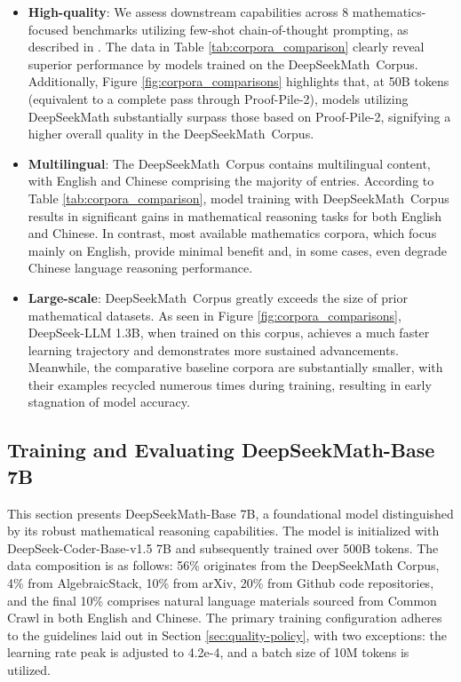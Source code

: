 \begin{itemize}[topsep=0pt]
\begin{itemize}[topsep=0pt]
    \item \textbf{High-quality}: 
    We assess downstream capabilities across 8 mathematics-focused benchmarks utilizing few-shot chain-of-thought prompting, as described in \cite{cot}. The data in Table \ref{tab:corpora_comparison} clearly reveal superior performance by models trained on the DeepSeekMath~Corpus. Additionally, Figure \ref{fig:corpora_comparisons} highlights that, at 50B tokens (equivalent to a complete pass through Proof-Pile-2), models utilizing DeepSeekMath substantially surpass those based on Proof-Pile-2, signifying a higher overall quality in the DeepSeekMath~Corpus.
    \item \textbf{Multilingual}:
    The DeepSeekMath~Corpus contains multilingual content, with English and Chinese comprising the majority of entries. According to Table \ref{tab:corpora_comparison}, model training with DeepSeekMath~Corpus results in significant gains in mathematical reasoning tasks for both English and Chinese. In contrast, most available mathematics corpora, which focus mainly on English, provide minimal benefit and, in some cases, even degrade Chinese language reasoning performance.
    \item \textbf{Large-scale}:
    DeepSeekMath~Corpus greatly exceeds the size of prior mathematical datasets. As seen in Figure \ref{fig:corpora_comparisons}, DeepSeek-LLM 1.3B, when trained on this corpus, achieves a much faster learning trajectory and demonstrates more sustained advancements. Meanwhile, the comparative baseline corpora are substantially smaller, with their examples recycled numerous times during training, resulting in early stagnation of model accuracy.
\end{itemize}

\subsection{Training and Evaluating DeepSeekMath-Base 7B}

This section presents DeepSeekMath-Base 7B, a foundational model distinguished by its robust mathematical reasoning capabilities. The model is initialized with DeepSeek-Coder-Base-v1.5 7B \citep{deepseek-coder} and subsequently trained over 500B tokens. The data composition is as follows: 56\% originates from the DeepSeekMath Corpus, 4\% from AlgebraicStack, 10\% from arXiv, 20\% from Github code repositories, and the final 10\% comprises natural language materials sourced from Common Crawl in both English and Chinese. The primary training configuration adheres to the guidelines laid out in Section \ref{sec:quality-policy}, with two exceptions: the learning rate peak is adjusted to 4.2e-4, and a batch size of 10M tokens is utilized.


\end{itemize}
